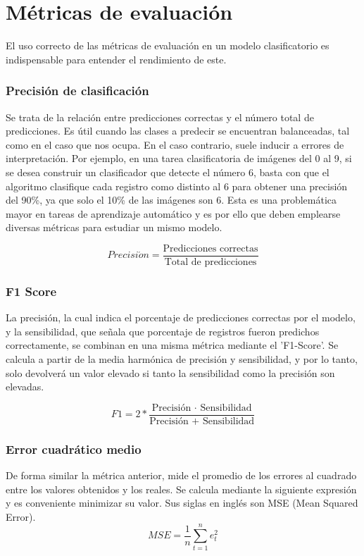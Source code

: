 \documentclass{report}
\begin{document}
\section{Métricas de evaluación}

El uso correcto de las métricas de evaluación en un modelo
clasificatorio es indispensable para entender el rendimiento de este.

\subsubsection{Precisión de clasificación}

Se trata de la relación entre predicciones correctas y el número total
de predicciones. Es útil cuando las clases a predecir se encuentran
balanceadas, tal como en el caso que nos ocupa. En el caso contrario,
suele inducir a errores de interpretación. Por ejemplo, en una tarea
clasificatoria de imágenes del 0 al 9, si se desea construir un
clasificador que detecte el número 6, basta con que el algoritmo
clasifique cada registro como distinto al 6 para obtener una precisión
del 90\%, ya que solo el 10\% de las imágenes son 6. Esta es una
problemática mayor en tareas de aprendizaje automático y es por ello que
deben emplearse diversas métricas para estudiar un mismo modelo.


\[Precisi\acute{o}n = \frac{\textrm{Predicciones correctas}}{\textrm{Total de predicciones}}\]

\subsubsection{F1 Score}

La precisión, la cual indica el porcentaje de predicciones correctas por
el modelo, y la sensibilidad, que señala que porcentaje de registros
fueron predichos correctamente, se combinan en una misma métrica mediante el 'F1-Score'. Se
calcula a partir de la media harmónica de precisión y sensibilidad, y
por lo tanto, solo devolverá un valor elevado si tanto la sensibilidad
como la precisión son elevadas.

\[F1 =2 * \frac{\textrm{Precisión · Sensibilidad}}{\textrm{Precisión + Sensibilidad}}\]

\subsubsection{Error cuadrático medio}

De forma similar la métrica anterior, mide el promedio de los errores al
cuadrado entre los valores obtenidos y los reales. Se calcula mediante
la siguiente expresión y es conveniente minimizar su valor. Sus siglas
en inglés son MSE (Mean Squared Error).
\begin{equation}
 MSE =\frac{1}{n}\sum_{t=1}^{n}e_t^2
  \label{}
\end{equation}
\end{document}
